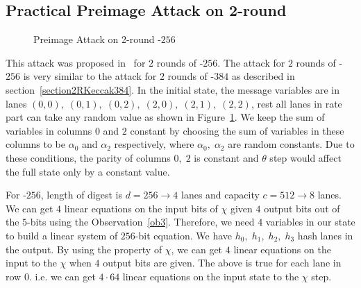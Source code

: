 \subsection{Practical Preimage Attack on 2-round }\label{section2RKeccak256}
    \begin{figure}
        \centering
        \caption{Preimage Attack on 2-round \KECCAK-$256$}
        \label{fig:2rkeccak256}
    \end{figure}

    This attack was proposed in~\cite{guo2016linear} for $2$ rounds of \KECCAK-$256$. The attack for $2$ rounds of \KECCAK-$256$ is very similar to the attack for $2$ rounds of \KECCAK-$384$ as described in section~\ref{section2RKeccak384}. In the initial state, the message variables are in lanes $(0, 0),\;(0, 1),\;(0, 2),\;(2, 0),\;(2, 1),\;(2, 2)$, rest all lanes in rate part can take any random value as shown in Figure~\ref{fig:2rkeccak256}. We keep the sum of variables in columns $0$ and $2$ constant by choosing the sum of variables in these columns to be $\alpha_0$ and $\alpha_2$ respectively, where $\alpha_0,\; \alpha_2$ are random constants. Due to these conditions, the parity of columns $0,\; 2$ is constant and $\theta$ step would affect the full state only by a constant value.
    
    For \KECCAK-$256$, length of digest is $d = 256 \rightarrow 4$ lanes and capacity $c = 512 \rightarrow 8$ lanes. We can get $4$ linear equations on the input bits of $\chi$ given $4$ output bits out of the $5$-bits using the Observation~\ref{ob3}. Therefore, we need $4$ variables in our state to build a linear system of $256$-bit equation. We have $h_0,\; h_1,\; h_2,\; h_3$  hash lanes in the output. By using the property of $\chi$, we can get $4$ linear equations on the input to the $\chi$ when $4$ output bits are given. The above is true for each lane in row $0$. i.e. we can get $4 \cdot 64$ linear equations on the input state to the $\chi$ step.
    
